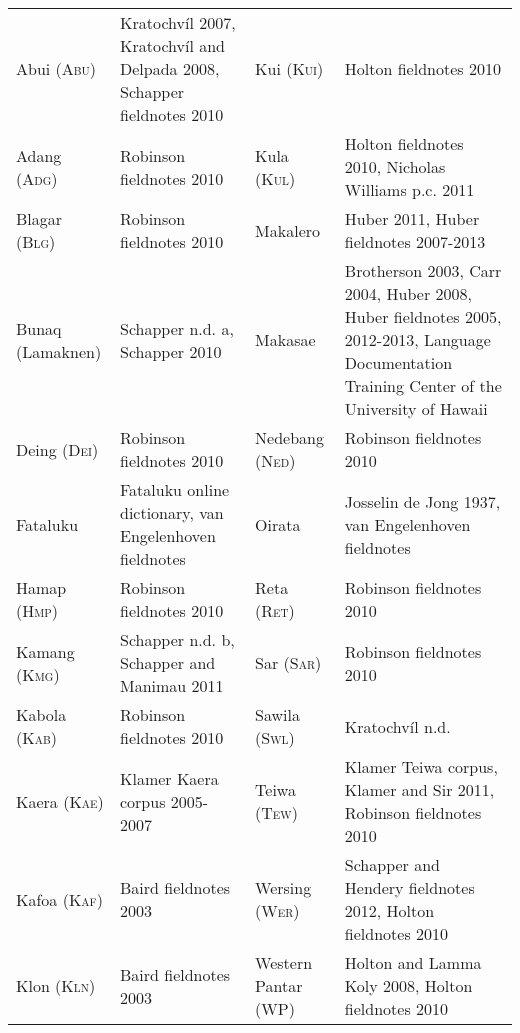 \documentclass[a4paper]{article}
\begin{document}
\begin{flushleft}
\tablehead{}
\begin{supertabular}{m{1.3525599in}m{1.7087599in}m{1.0622599in}m{1.7108599in}}
Abui (\textsc{Abu}) &
Kratochv\'il 2007, Kratochv\'il and Delpada 2008, Schapper fieldnotes 2010 &
Kui (\textsc{Kui}) &
Holton fieldnotes 2010\\
Adang (\textsc{Adg}) &
Robinson fieldnotes 2010 &
Kula (\textsc{Kul}) &
Holton fieldnotes 2010, Nicholas Williams p.c. 2011\\
Blagar (\textsc{Blg}) &
Robinson fieldnotes 2010 &
Makalero &
Huber 2011, Huber fieldnotes 2007-2013\\
Bunaq (Lamaknen) &
Schapper n.d. a, Schapper 2010 &
Makasae &
Brotherson 2003, Carr 2004, Huber 2008, Huber fieldnotes 2005, 2012-2013, Language Documentation Training Center of the University of Hawaii\footnotemark{}\\
Deing (\textsc{Dei}) &
Robinson fieldnotes 2010 &
Nedebang (N\textsc{ed}) &
Robinson fieldnotes 2010\\
Fataluku &
Fataluku online dictionary\footnotemark{}, van Engelenhoven fieldnotes &
Oirata &
Josselin de Jong 1937, van Engelenhoven fieldnotes\\
Hamap (H\textsc{mp}) &
Robinson fieldnotes 2010 &
Reta (\textsc{Ret}) &
 Robinson fieldnotes 2010\\
Kamang (\textsc{Kmg}) &
Schapper n.d. b, Schapper and Manimau 2011 &
Sar (S\textsc{ar}) &
Robinson fieldnotes 2010\\
Kabola (K\textsc{ab}) &
Robinson fieldnotes 2010 &
Sawila (S\textsc{wl}) &
Kratochv\'il n.d.\\
Kaera (K\textsc{ae}) &
Klamer Kaera corpus 2005-2007 &
Teiwa (\textsc{Tew}) &
Klamer Teiwa corpus, Klamer and Sir 2011, Robinson fieldnotes 2010\\
Kafoa (\textsc{Kaf}) &
Baird fieldnotes 2003 &
Wersing (\textsc{Wer}) &
Schapper and Hendery fieldnotes 2012, Holton fieldnotes 2010\\
Klon (\textsc{Kln}) &
Baird fieldnotes 2003 &
Western Pantar (WP) &
Holton and Lamma Koly 2008, Holton fieldnotes 2010\\
\end{supertabular}
\end{flushleft}
\addtocounter{footnote}{-2}
\end{document}
